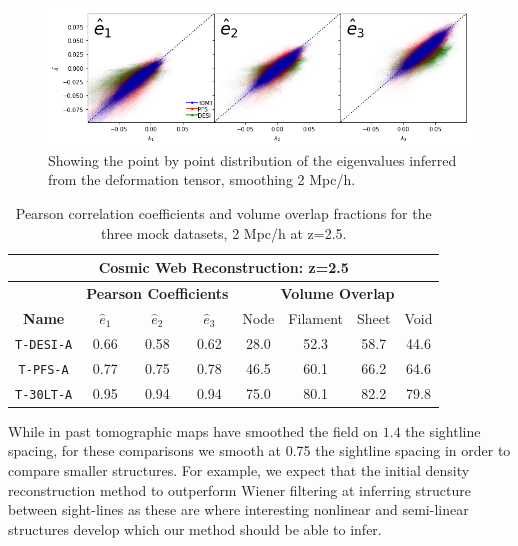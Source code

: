 \documentclass[usenatbib,onecolumn]{mnras}
\begin{document}
\begin{figure}
  \centering 
  
  \includegraphics[trim=1cm 0cm 0cm 0cm,width=1.0\textwidth]{./figs_treepm/eigenvalues_z=2.png}
    \caption{Showing the point by point distribution of the eigenvalues inferred from the deformation tensor, smoothing 2 Mpc/h.} 
    \label{fig_eigenvalues}
\end{figure}

\begin{table}
  \begin{center}
    \label{tab:table1}
    \begin{tabular}{c|c|c|c|c|c|c|c} 
    
\multicolumn{8}{|c||}{\textbf{Cosmic Web Reconstruction: z=2.5}}
 \\ 
          \hline
      \hline

& \multicolumn{3}{|c||}{\textbf{Pearson Coefficients}} & \multicolumn{4}{|c||}{\textbf{Volume Overlap}} 
 \\ 
      \hline
      \textbf{Name}& $\hat{e}_1$ &  $\hat{e}_2$ & $\hat{e}_3$ & Node & Filament & Sheet & Void\\
      \hline
      \hline


        \texttt{T-DESI-A} & 0.66 & 0.58 & 0.62 & 28.0 & 52.3 & 58.7 & 44.6\\
        \texttt{T-PFS-A}& 0.77 & 0.75 & 0.78 & 46.5 & 60.1 & 66.2 & 64.6 \\
        \texttt{T-30LT-A} & 0.95 & 0.94 & 0.94 & 75.0 & 80.1 & 82.2 & 79.8\\
    \end{tabular}
        \caption{Pearson correlation coefficients and volume overlap fractions for the three mock datasets, 2 Mpc/h at z=2.5.}

  \end{center}
\end{table}

While in past tomographic maps \cite{Lee2017} have smoothed the field on $1.4$ the sightline spacing, for these comparisons we smooth at 0.75 the sightline spacing in order to compare smaller structures. For example, we expect that the initial density reconstruction method to outperform Wiener filtering at inferring structure between sight-lines as these are where interesting nonlinear and semi-linear structures develop which our method should be able to infer. 
\end{document}
